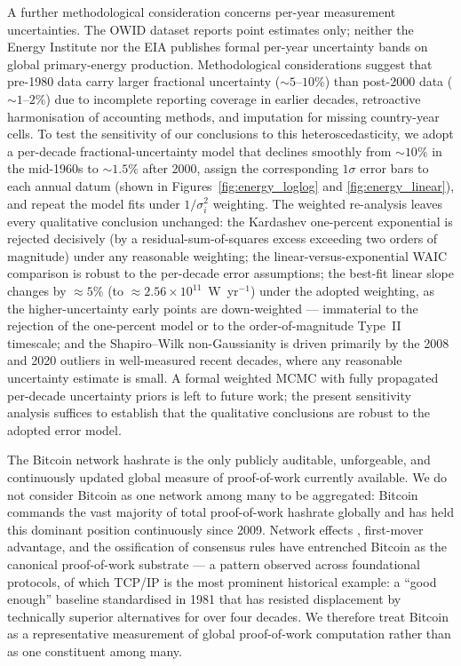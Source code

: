 A further methodological consideration concerns per-year measurement uncertainties. The
OWID dataset reports point estimates only; neither the Energy Institute nor the EIA
publishes formal per-year uncertainty bands on global primary-energy production.
Methodological considerations suggest that pre-1980 data carry larger fractional
uncertainty ($\sim5$--$10\%$) than post-2000 data ($\sim1$--$2\%$) due to incomplete
reporting coverage in earlier decades, retroactive harmonisation of accounting methods,
and imputation for missing country-year cells. To test the sensitivity of our conclusions
to this heteroscedasticity, we adopt a per-decade fractional-uncertainty model that
declines smoothly from $\sim10\%$ in the mid-1960s to $\sim1.5\%$ after 2000, assign the
corresponding $1\sigma$ error bars to each annual datum (shown in
Figures~\ref{fig:energy_loglog} and \ref{fig:energy_linear}), and repeat the model fits
under $1/\sigma_i^2$ weighting. The weighted re-analysis leaves every qualitative
conclusion unchanged: the Kardashev one-percent exponential is rejected decisively
(by a residual-sum-of-squares excess exceeding two orders of magnitude) under any
reasonable weighting; the linear-versus-exponential WAIC comparison is robust to the
per-decade error assumptions; the best-fit linear slope changes by
$\approx5\%$ (to $\approx2.56\times10^{11}$~W~yr$^{-1}$) under the adopted weighting, as the
higher-uncertainty early points are down-weighted --- immaterial to the rejection of the
one-percent model or to the order-of-magnitude Type~II timescale; and the Shapiro--Wilk
non-Gaussianity is driven
primarily by the 2008 and 2020 outliers in well-measured recent decades, where any
reasonable uncertainty estimate is small. A formal weighted MCMC with fully propagated
per-decade uncertainty priors is left to future work; the present sensitivity analysis
suffices to establish that the qualitative conclusions are robust to the adopted error
model.

The Bitcoin network hashrate is the only publicly auditable, unforgeable, and continuously
updated global measure of proof-of-work currently available. We do not consider Bitcoin as
one network among many to be aggregated: Bitcoin commands the vast majority of total
proof-of-work hashrate globally and has held this dominant position continuously since
2009. Network effects \citep{Metcalfe2013}, first-mover advantage, and the ossification of
consensus rules have entrenched Bitcoin as the canonical proof-of-work substrate --- a
pattern observed across foundational protocols, of which TCP/IP is the most prominent
historical example: a ``good enough'' baseline standardised in 1981 that has resisted
displacement by technically superior alternatives for over four decades. We therefore
treat Bitcoin as a representative measurement of global proof-of-work computation rather
than as one constituent among many.

